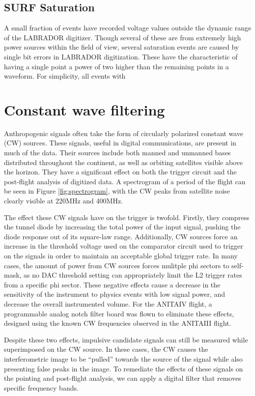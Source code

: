 	\subsection{SURF Saturation}
		A small fraction of events have recorded voltage values outside the dynamic range of the LABRADOR digitizer.  Though several of these are from extremely high power sources within the field of view, several saturation events are caused by single bit errors in LABRADOR digitization.  These have the characteristic of having a single point a power of two higher than the remaining points in a waveform.  For simplicity, all events with 
		
\section{Constant wave filtering}
	Anthropogenic signals often take the form of circularly polarized constant wave (CW) sources.  These signals, useful in digital communications, are present in much of the data.  Their sources include both manned and unmanned bases distributed throughout the continent, as well as orbiting satellites visible above the horizon.  They have a significant effect on both the trigger circuit and the post-flight analysis of digitized data.  A spectrogram of a period of the flight can be seen in Figure \ref{fig:spectrogram}, with the CW peaks from satellite noise clearly visible at 220MHz and 400MHz.
	
	The effect these CW signals have on the trigger is twofold.  Firstly, they compress the tunnel diode by increasing the total power of the input signal, pushing the diode response out of its square-law range.  Additionally, CW sources force an increase in the threshold voltage used on the comparator circuit used to trigger on the signals in order to maintain an acceptable global trigger rate.  In many cases, the amount of power from CW sources forces mulitple phi sectors to self-mask, as no DAC threshold setting can appropriately limit the L2 trigger rates from a specific phi sector.  These negative effects cause a decrease in the sensitivity of the instrument to physics events with low signal power, and decrease the overall instrumented volume.  For the ANITAIV flight, a programmable analog notch filter board was flown to eliminate these effects, designed using the known CW frequencies observed in the ANITAIII flight.

	
	Despite these two effects, impulsive candidate signals can still be measured while superimposed on the CW source.  In these cases, the CW causes the interferometric image to be ``pulled'' towards the source of the signal while also presenting false peaks in the image.  To remediate the effects of these signals on the pointing and post-flight analysis, we can apply a digital filter that removes specific frequency bands.
	
